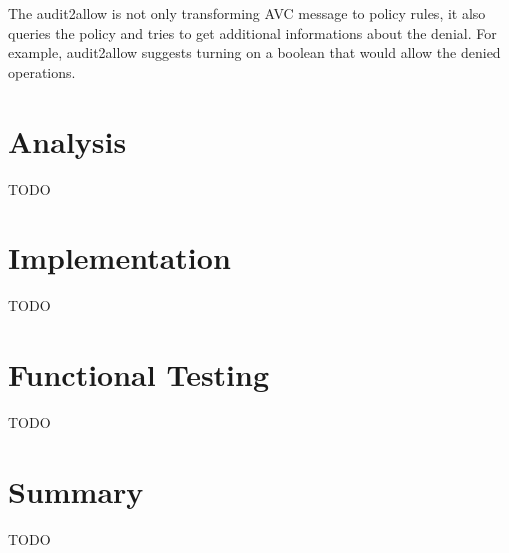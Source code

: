 The audit2allow is not only transforming AVC message to policy rules, it also queries the policy and tries to get additional informations about the denial. For example, audit2allow suggests turning on a boolean that would allow the denied operations.


\chapter{Analysis}
TODO

\chapter{Implementation}
TODO

\chapter{Functional Testing}
TODO

\chapter{Summary}
TODO
